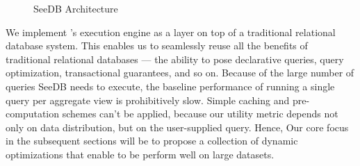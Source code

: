 \begin{figure}[htb]
\vspace{-10pt}
\centerline{
\hbox{}}
\vspace{-18pt}
\caption{SeeDB Architecture}
\label{fig:sys-arch}
\vspace{-12pt}
\end{figure} 

We implement \SeeDB's execution engine as a layer on top of a
traditional relational database system.
This enables us to seamlessly reuse all the benefits
of traditional relational databases --- the ability
to pose declarative queries, query optimization, transactional guarantees,
and so on.  Because of the large number of queries SeeDB needs to execute,
the baseline performance of running a single query per aggregate view
is prohibitively slow. Simple caching and pre-computation schemes can't be applied,
because our utility metric depends not only on data distribution, but on
the user-supplied query. Hence,
Our core focus in the subsequent sections will
be to propose a collection of dynamic optimizations
that enable \SeeDB to be perform well 
on large datasets. 



